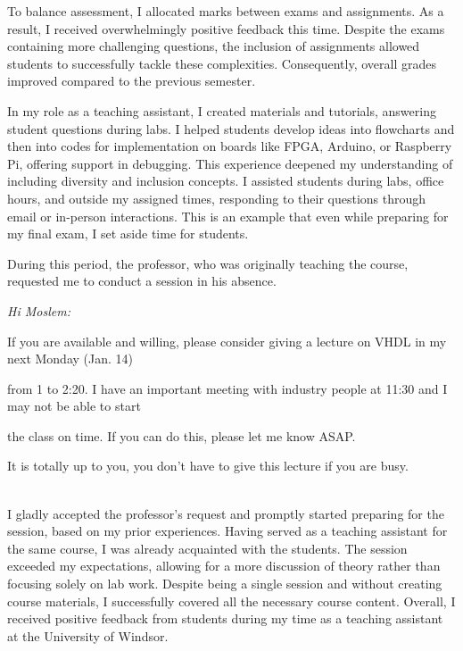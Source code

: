 To balance assessment, I allocated marks between exams and assignments. As a result, I received overwhelmingly positive feedback this time. Despite the exams containing more challenging questions, the inclusion of assignments allowed students to successfully tackle these complexities. Consequently, overall grades improved compared to the previous semester.

In my role as a teaching assistant, I created materials and tutorials, answering student questions during labs. I helped students develop ideas into flowcharts and then into codes for implementation on boards like FPGA, Arduino, or Raspberry Pi, offering support in debugging.
This experience deepened my understanding of  including diversity and inclusion concepts. I assisted students during labs, office hours, and outside my assigned times, responding to their questions through email or in-person interactions. This is an example that even while preparing for my final exam, I set aside time for students.


During this period, the professor, who was originally teaching the course, requested me to conduct a session in his absence. \\
{\itshape
Hi Moslem:


If you are available and willing, please consider giving a lecture on VHDL in my next Monday (Jan. 14)

from 1 to 2:20. I have an important meeting with industry people at 11:30 and I may not be able to start 

the class on time. If you can do this, please let me know ASAP.


It is totally up to you, you don't have to give this lecture if you are busy.}\\

I gladly accepted the professor's request and promptly started preparing for the session, based on my prior experiences.
Having served as a teaching assistant for the same course, I was already acquainted with the students. The session exceeded my expectations, allowing for a more  discussion of theory rather than focusing solely on lab work. Despite being a single session and without creating course materials, I successfully covered all the necessary course content. Overall, I received positive feedback from students during my time as a teaching assistant at the University of Windsor.


